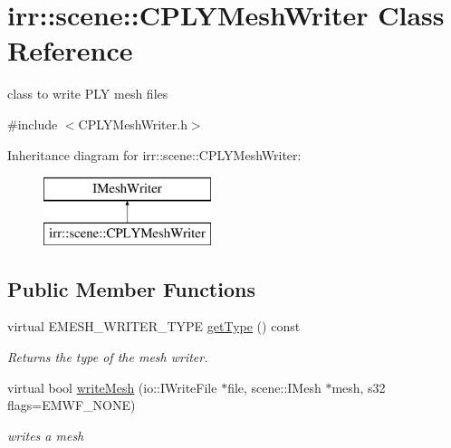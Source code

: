 \hypertarget{classirr_1_1scene_1_1_c_p_l_y_mesh_writer}{\section{irr\-:\-:scene\-:\-:C\-P\-L\-Y\-Mesh\-Writer Class Reference}
\label{classirr_1_1scene_1_1_c_p_l_y_mesh_writer}
}


class to write P\-L\-Y mesh files  




{\ttfamily \#include $<$C\-P\-L\-Y\-Mesh\-Writer.\-h$>$}

Inheritance diagram for irr\-:\-:scene\-:\-:C\-P\-L\-Y\-Mesh\-Writer\-:\begin{figure}[H]
\begin{center}
\leavevmode
\includegraphics[height=2.000000cm]{classirr_1_1scene_1_1_c_p_l_y_mesh_writer}
\end{center}
\end{figure}
\subsection*{Public Member Functions}
\begin{DoxyCompactItemize}
\item 
\hypertarget{classirr_1_1scene_1_1_c_p_l_y_mesh_writer_a665a2332a6273d67fa0a9d0fc3883ca9}{virtual E\-M\-E\-S\-H\-\_\-\-W\-R\-I\-T\-E\-R\-\_\-\-T\-Y\-P\-E \hyperlink{classirr_1_1scene_1_1_c_p_l_y_mesh_writer_a665a2332a6273d67fa0a9d0fc3883ca9}{get\-Type} () const }\label{classirr_1_1scene_1_1_c_p_l_y_mesh_writer_a665a2332a6273d67fa0a9d0fc3883ca9}

\begin{DoxyCompactList}\small\item\em Returns the type of the mesh writer. \end{DoxyCompactList}\item 
\hypertarget{classirr_1_1scene_1_1_c_p_l_y_mesh_writer_a73c4da46ab33bee6e5fa8eebe7e87909}{virtual bool \hyperlink{classirr_1_1scene_1_1_c_p_l_y_mesh_writer_a73c4da46ab33bee6e5fa8eebe7e87909}{write\-Mesh} (io\-::\-I\-Write\-File $\ast$file, scene\-::\-I\-Mesh $\ast$mesh, s32 flags=E\-M\-W\-F\-\_\-\-N\-O\-N\-E)}\label{classirr_1_1scene_1_1_c_p_l_y_mesh_writer_a73c4da46ab33bee6e5fa8eebe7e87909}

\begin{DoxyCompactList}\small\item\em writes a mesh \end{DoxyCompactList}\end{DoxyCompactItemize}


